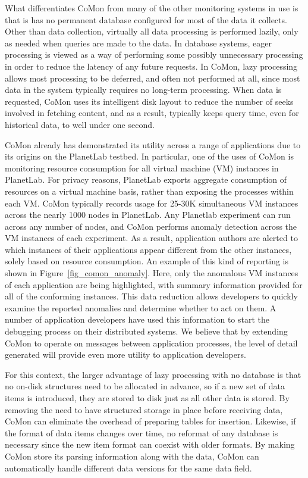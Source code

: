 What differentiates CoMon from many of the other monitoring systems in
use is that is has no permanent database configured for most of the
data it collects. Other than data collection, virtually all data
processing is performed lazily, only as needed when queries are made
to the data. In database systems, eager processing is viewed as a way
of performing some possibly unnecessary processing in order to reduce
the latency of any future requests. In CoMon, lazy processing allows
most processing to be deferred, and often not performed at all, since
most data in the system typically requires no long-term processing.
When data is requested, CoMon uses its intelligent disk layout to
reduce the number of seeks involved in fetching content, and as a
result, typically keeps query time, even for historical data, to well
under one second.

CoMon already has demonstrated its utility across a range of
applications due to its origins on the PlanetLab testbed. In
particular, one of the uses of CoMon is monitoring resource
consumption for all virtual machine (VM) instances in PlanetLab. For
privacy reasons, PlanetLab exports aggregate consumption of resources
on a virtual machine basis, rather than exposing the processes within
each VM. CoMon typically records usage for 25-30K simultaneous VM
instances across the nearly 1000 nodes in PlanetLab. Any Planetlab
experiment can run across any number of nodes, and CoMon performs
anomaly detection across the VM instances of each experiment. As a
result, application authors are alerted to which instances of their
applications appear different from the other instances, solely based
on resource consumption. An example of this kind of reporting is shown
in Figure~\ref{fig_comon_anomaly}. Here, only the anomalous VM
instances of each application are being highlighted, with summary
information provided for all of the conforming instances. This data
reduction allows developers to quickly examine the reported anomalies
and determine whether to act on them. A number of application
developers have used this information to start the debugging process
on their distributed systems. We believe that by extending CoMon to
operate on messages between application processes, the level of detail
generated will provide even more utility to application developers.

For this context, the larger advantage of lazy processing with no
database is that no on-disk structures need to be allocated in
advance, so if a new set of data items is introduced, they are stored
to disk just as all other data is stored. By removing the need to have
structured storage in place before receiving data, CoMon can eliminate
the overhead of preparing tables for insertion. Likewise, if the
format of data items changes over time, no reformat of any database is
necessary since the new item format can coexist with older formats. By
making CoMon store its parsing information along with the data, CoMon
can automatically handle different data versions for the same data
field.


